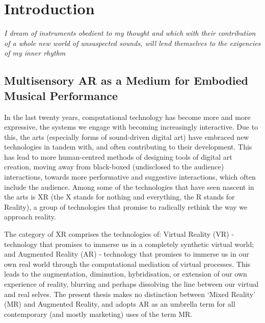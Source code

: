 \chapter{Introduction}
\label{sec: introduction}
\epigraph{\emph{I dream of instruments obedient to my thought and which with their contribution of a whole new world of unsuspected sounds, will lend themselves to the exigencies of my inner rhythm}}{\citep{varese1966}}
\section{Multisensory AR as a Medium for Embodied Musical Performance}\label{sec: introduction-summary}
In the last twenty years, computational technology has become more and more expressive, the systems we engage with becoming increasingly interactive. Due to this, the arts (especially forms of sound-driven digital art) have embraced new technologies in tandem with, and often contributing to their development. This has lead to more human-centred methods of designing tools of digital art creation, moving away from black-boxed (undisclosed to the audience) interactions, towards more performative and suggestive interactions, which often include the audience. Among some of the technologies that have seen nascent in the arts is XR (the X stands for nothing and everything, the R stands for Reality), a group of technologies that promise to radically rethink the way we approach reality. 

The category of XR comprises the technologies of: Virtual Reality (VR) - technology that promises to immerse us in a completely synthetic virtual world; and Augmented Reality (AR) -  technology that promises to immerse us in our own real world through the computational mediation of virtual processes. This leads to the augmentation, diminution, hybridisation, or extension of our own experience of reality, blurring and perhaps dissolving the line between our virtual and real selves. The present thesis makes no distinction between `Mixed Reality' (MR) and Augmented Reality, and adopts AR as an umbrella term for all contemporary (and mostly marketing) uses of the term MR.

